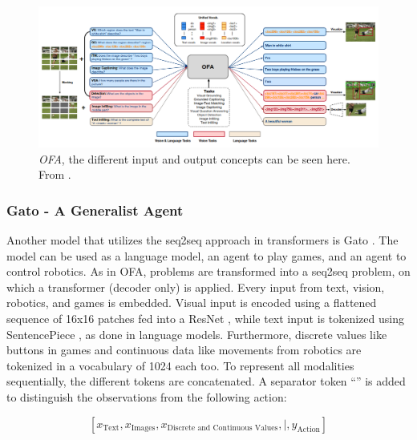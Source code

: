 \documentclass[
]{krantz}
\begin{document}
\begin{figure}

{\centering \includegraphics[width=1\linewidth]{figures/03-03-multipurpose/OFA} 

}

\caption{\emph{OFA}, the different input and output concepts can be seen here. From \citet{Wang2022}.}\label{fig:ofa}
\end{figure}



\hypertarget{gato---a-generalist-agent}{%
\subsubsection{Gato - A Generalist Agent}\label{gato---a-generalist-agent}}

Another model that utilizes the seq2seq approach in transformers is Gato \citep{Reed2022}. The model can be used as a language model, an agent to play games, and an agent to control robotics.
As in OFA, problems are transformed into a seq2seq problem, on which a transformer (decoder only) is applied. Every input from text, vision, robotics, and games is embedded. Visual input is encoded using a flattened sequence of 16x16 patches fed into a ResNet \citep{ResNet}, while text input is tokenized using SentencePiece \citep{kudo-richardson-2018-sentencepiece}, as done in language models. Furthermore, discrete values like buttons in games and continuous data like movements from robotics are tokenized in a vocabulary of 1024 each too. To represent all modalities sequentially, the different tokens are concatenated. A separator token ``\textbar{}'' is added to distinguish the observations from the following action:

\[\left [ x_{\textrm{Text}}, x_{\textrm{Images}}, x_{\textrm{Discrete and Continuous Values}}, |, y_{\textrm{Action}} \right ]\]
\end{document}
